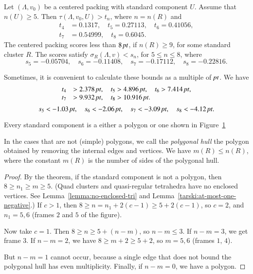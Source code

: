 \begin{theorem}
    \label{thm:the-main-theorem}
    Let $(\Lambda,v_0)$ be a centered packing  with
standard component $U$.  Assume that $n(U)\ge 5$.
Then
$\tau(\Lambda,v_0,U) > t_n$, where $n=n(R)$ and
    $$
    \begin{array}{lll}
    t_4&=0.1317,\quad t_5=0.27113,\quad
    t_6=0.41056,\\
    t_7&=0.54999,\quad t_8=0.6045.
    \end{array}
    $$
The centered packing scores less than $8\,\hbox{\it pt}$, if $n(R)\ge 9$,
for some standard cluster $R$. The scores satisfy
$\sigma_R(\Lambda,v)<s_n$, for $5\le n\le 8$, where
    $$
    s_5=-0.05704,\quad s_6=-0.11408,\quad
    s_7=-0.17112,\quad s_8=-0.22816.
    $$
\end{theorem}

Sometimes, it is convenient to calculate these bounds as a multiple
of $\hbox{\it pt}$.  We have
    $$
    \begin{array}{lll}
    t_4&>2.378\,\hbox{\it pt},\quad t_5>4.896\,\hbox{\it pt},\quad
    t_6>7.414\,\hbox{\it pt},\\
    t_7&>9.932\,\hbox{\it pt},\quad
    t_8>10.916\,\hbox{\it pt}.
    \end{array}
    $$
    $$
    s_5 < -1.03\,\hbox{\it pt},\quad s_6<-2.06\,\hbox{\it pt},\quad
    s_7<-3.09\,\hbox{\it pt},\quad s_8<-4.12\,\hbox{\it pt}.
    $$




\begin{corollary}
    \label{cor:std-aggregate-list}
Every standard component is a either a polygon or one shown in
Figure~\ref{fig:std-aggregates}
\end{corollary}



\begin{figure}[htb]
  \centering
  \caption{}
  \label{fig:std-aggregates}
\end{figure}


In the cases that are not (simple) polygons, we call the {\it polygonal
hull\/} the polygon obtained by removing the internal edges and
vertices. We have $m(R)\le n(R)$, where the constant $m(R)$ is the
number of sides of the polygonal hull.

\begin{proof}
By the theorem, if the standard component is not a polygon, then $8\ge
n_1\ge m\ge 5$. (Quad clusters and quasi-regular tetrahedra have no
enclosed vertices. See Lemma~\ref{lemma:no-enclosed-tri} and
Lemma~\ref{tarski:at-most-one-negative}.) If $c>1$, then $8\ge
n=n_1+2(c-1)\ge 5+2(c-1)$, so $c=2$, and $n_1=5,6$ (frames $2$ and $5$
of the figure).

Now take $c=1$.    Then $8\ge n\ge 5+(n-m)$, so $n-m\le 3$.  If $n-m=3$,
we get frame $3$. If $n-m=2$, we have $8\ge m+2\ge 5+2$, so $m=5,6$
(frames $1$, $4$).

But $n-m=1$ cannot occur, because a single edge that does not bound the
polygonal hull has even multiplicity.  Finally, if $n-m=0$, we have a
polygon.
\end{proof}

